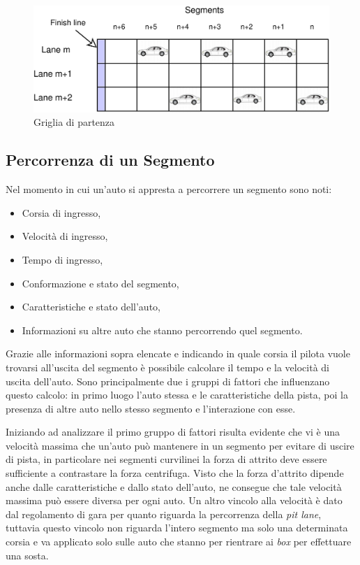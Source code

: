 \documentclass[a4paper]{report}
\begin{document}
\begin{figure}
\includegraphics[width=\textwidth]{diagrammi/StartGrid}
\caption{Griglia di partenza}
\label{fig:startGrid}
\end{figure}

\subsection{Percorrenza di un Segmento}
\label{sec:percorrenza}
Nel momento in cui un'auto si appresta a percorrere un segmento sono noti:
\begin{itemize}
\item Corsia di ingresso,
\item Velocità di ingresso,
\item Tempo di ingresso,
\item Conformazione e stato del segmento,
\item Caratteristiche e stato dell'auto,
\item Informazioni su altre auto che stanno percorrendo quel segmento.
\end{itemize}

Grazie alle informazioni sopra elencate e indicando in quale corsia il pilota vuole trovarsi all'uscita del segmento è possibile calcolare il tempo e la velocità di uscita dell'auto. Sono principalmente due i gruppi di fattori che influenzano questo calcolo: in primo luogo l'auto stessa e le caratteristiche della pista, poi la presenza di altre auto nello stesso segmento e l'interazione con esse.

Iniziando ad analizzare il primo gruppo di fattori risulta evidente che vi è una velocità massima che un'auto può mantenere in un segmento per evitare di uscire di pista, in particolare nei segmenti curvilinei la forza di attrito deve essere sufficiente a contrastare la forza centrifuga.
Visto che la forza d'attrito dipende anche dalle caratteristiche e dallo stato dell'auto, ne consegue che tale velocità massima può essere diversa per ogni auto.
Un altro vincolo alla velocità è dato dal regolamento di gara per quanto riguarda la percorrenza della \textit{pit lane}, tuttavia questo vincolo non riguarda l'intero segmento ma solo una determinata corsia e va applicato solo sulle auto che stanno per rientrare ai \textit{box} per effettuare una sosta.
\end{document}
